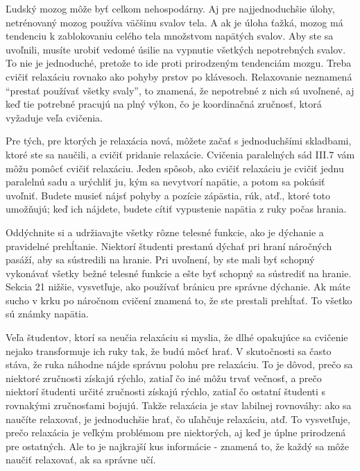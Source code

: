 Ľudský mozog môže byť celkom nehospodárny. Aj pre najjednoduchšie úlohy, netrénovaný mozog používa väčšinu svalov tela. A ak je úloha ťažká, mozog má tendenciu k zablokovaniu celého tela množstvom napätých svalov. Aby ste sa uvoľnili, musíte urobiť vedomé úsilie na vypnutie všetkých nepotrebných svalov. To nie je jednoduché, pretože to ide proti prirodzeným tendenciám mozgu. Treba cvičiť relaxáciu rovnako ako pohyby prstov po klávesoch. Relaxovanie neznamená “prestať používať všetky svaly”, to znamená, že nepotrebné z nich sú uvoľnené, aj keď tie potrebné pracujú na plný výkon, čo je koordinačná zručnosť, ktorá vyžaduje veľa cvičenia.

Pre tých, pre ktorých je relaxácia nová, môžete začať s jednoduchšími skladbami, ktoré ste sa naučili, a cvičiť pridanie relaxácie. Cvičenia paralelných sád III.7 vám môžu pomôcť cvičiť relaxáciu. Jeden spôsob, ako cvičiť relaxáciu je cvičiť jednu paralelnú sadu a urýchliť ju, kým  sa nevytvorí napätie, a potom sa pokúsiť uvoľniť. Budete musieť nájsť pohyby a pozície zápästia, rúk,  atď., ktoré toto umožňujú; keď ich nájdete, budete cítiť vypustenie napätia z ruky počas hrania.

Oddýchnite si a udržiavajte všetky rôzne telesné funkcie, ako je dýchanie a pravidelné prehĺtanie. Niektorí študenti prestanú dýchať pri hraní náročných pasáží, aby sa sústredili na hranie. Pri uvoľnení, by ste mali byť schopný vykonávať všetky bežné telesné funkcie a ešte byť schopný sa sústrediť na hranie. Sekcia 21 nižšie, vysvetľuje, ako používať bránicu pre správne dýchanie. Ak máte sucho v krku po náročnom cvičení znamená to, že ste prestali prehĺtať. To všetko sú známky napätia.

Veľa študentov, ktorí sa neučia relaxáciu si myslia, že dlhé opakujúce sa cvičenie nejako transformuje ich ruky tak, že budú môcť hrať. V skutočnosti sa často stáva, že ruka náhodne nájde správnu polohu pre relaxáciu. To je dôvod, prečo sa niektoré zručnosti získajú rýchlo, zatiaľ čo iné môžu trvať večnosť, a prečo niektorí študenti určité zručnosti získajú rýchlo, zatiaľ čo ostatní študenti s rovnakými zručnosťami bojujú. Takže relaxácia je stav labilnej rovnováhy: ako sa naučíte relaxovať, je jednoduchšie hrať, čo uľahčuje relaxáciu, atď. To vysvetľuje, prečo relaxácia je veľkým problémom pre niektorých, aj keď je úplne prirodzená pre ostatných. Ale to je najkrajší kus informácie - znamená to, že každý sa môže naučiť relaxovať, ak sa správne učí.

